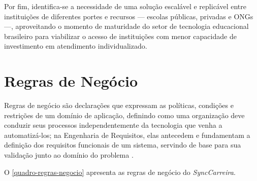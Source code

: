 Por fim, identifica-se a necessidade de uma solução escalável e replicável entre instituições de diferentes portes e recursos --- escolas públicas, privadas e ONGs ---, aproveitando o momento de maturidade do setor de tecnologia educacional brasileiro \cite{holoniq2024} para viabilizar o acesso de instituições com menor capacidade de investimento em atendimento individualizado.

\section{Regras de Negócio}\label{sec:regras-negocio}

Regras de negócio são declarações que expressam as políticas, condições e restrições de um domínio de aplicação, definindo como uma organização deve conduzir seus processos independentemente da tecnologia que venha a automatizá-los; na Engenharia de Requisitos, elas antecedem e fundamentam a definição dos requisitos funcionais de um sistema, servindo de base para sua validação junto ao domínio do problema \cite{pressman2021}.

O \autoref{quadro-regras-negocio} apresenta as regras de negócio do \textit{SyncCarreira}.

